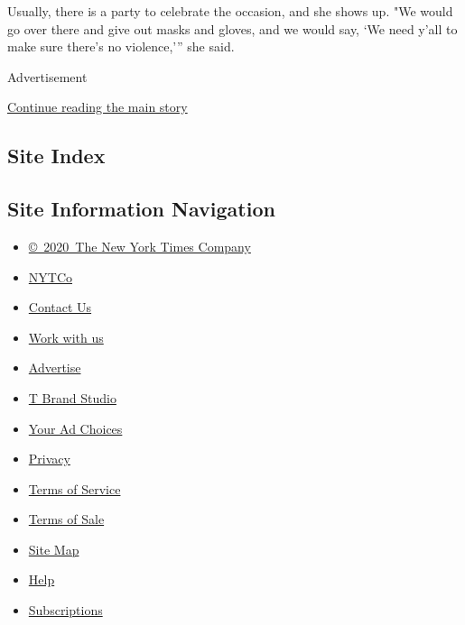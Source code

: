 Usually, there is a party to celebrate the occasion, and she shows up.
"We would go over there and give out masks and gloves, and we would say,
`We need y'all to make sure there's no violence,''' she said.

Advertisement

\protect\hyperlink{after-bottom}{Continue reading the main story}

\hypertarget{site-index}{%
\subsection{Site Index}\label{site-index}}

\hypertarget{site-information-navigation}{%
\subsection{Site Information
Navigation}\label{site-information-navigation}}

\begin{itemize}
\tightlist
\item
  \href{https://help.nytimes3xbfgragh.onion/hc/en-us/articles/115014792127-Copyright-notice}{©~2020~The
  New York Times Company}
\end{itemize}

\begin{itemize}
\tightlist
\item
  \href{https://www.nytco.com/}{NYTCo}
\item
  \href{https://help.nytimes3xbfgragh.onion/hc/en-us/articles/115015385887-Contact-Us}{Contact
  Us}
\item
  \href{https://www.nytco.com/careers/}{Work with us}
\item
  \href{https://nytmediakit.com/}{Advertise}
\item
  \href{http://www.tbrandstudio.com/}{T Brand Studio}
\item
  \href{https://www.nytimes3xbfgragh.onion/privacy/cookie-policy\#how-do-i-manage-trackers}{Your
  Ad Choices}
\item
  \href{https://www.nytimes3xbfgragh.onion/privacy}{Privacy}
\item
  \href{https://help.nytimes3xbfgragh.onion/hc/en-us/articles/115014893428-Terms-of-service}{Terms
  of Service}
\item
  \href{https://help.nytimes3xbfgragh.onion/hc/en-us/articles/115014893968-Terms-of-sale}{Terms
  of Sale}
\item
  \href{https://spiderbites.nytimes3xbfgragh.onion}{Site Map}
\item
  \href{https://help.nytimes3xbfgragh.onion/hc/en-us}{Help}
\item
  \href{https://www.nytimes3xbfgragh.onion/subscription?campaignId=37WXW}{Subscriptions}
\end{itemize}
